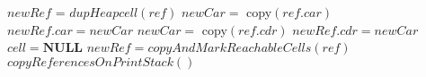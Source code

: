 \documentclass[9pt]{article}
\begin{document}
\begin{function*}
\SetStartEndCondition{ }{}{}%
%
%
%
\newcommand{\forcond}{$i$ \KwTo\Range{$n$}}
\AlgoDontDisplayBlockMarkers\SetAlgoNoEnd\SetAlgoNoLine%
%
%
{
    {
       {
         $\mathit{newRef}$ =  $dupHeapcell(\mathit{ref})$\; 
         $\mathit{ newCar}  =$  copy$\mathit{(ref.car)}$\;
         $\mathit{ newRef.car}   = \mathit{ newCar}$\;
         $\mathit{ newCar}  =$  copy$\mathit{(ref.cdr)}$\;
         $\mathit{ newRef.cdr}   = \mathit{ newCar}$\;
        }
       { $cell = {\mathbf{ NULL}}$ \;}}
     {
       {
         $\mathit{newRef}  = \mathit{copyAndMarkReachableCells(ref)}$\;
       }
    }
 $\mathit{copyReferencesOnPrintStack()}$\; 
}
\end{function*}
\end{document}
